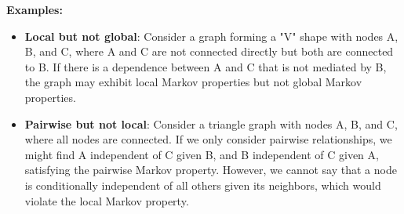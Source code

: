 \documentclass{article}
\begin{document}
\textbf{Examples:}

\begin{itemize}
  \item \textbf{Local but not global}: Consider a graph forming a "V" shape with nodes A, B, and C, where A and C are not connected directly but both are connected to B. If there is a dependence between A and C that is not mediated by B, the graph may exhibit local Markov properties but not global Markov properties.

  \item \textbf{Pairwise but not local}: Consider a triangle graph with nodes A, B, and C, where all nodes are connected. If we only consider pairwise relationships, we might find A independent of C given B, and B independent of C given A, satisfying the pairwise Markov property. However, we cannot say that a node is conditionally independent of all others given its neighbors, which would violate the local Markov property.

\end{itemize}
\end{document}

